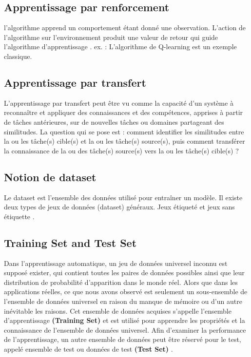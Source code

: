 \documentclass[12pt, french]{report}
\begin{document}
\subsection{Apprentissage par renforcement}l'algorithme apprend un comportement étant donné une observation. L'action de l'algorithme sur l'environnement produit une valeur de retour qui guide l'algorithme d'apprentissage \cite{key13}.
ex. : L'algorithme de Q-learning est un exemple classique.
\subsection{Apprentissage par transfert}
L’apprentissage par transfert peut être vu comme la capacité d’un système à reconnaître et appliquer des connaissances et des compétences, apprises à partir de tâches antérieures, sur de nouvelles tâches ou domaines partageant des similitudes. La question qui se pose est : comment identifier les similitudes entre la ou les tâche(s) cible(s) et la ou les tâche(s) source(s), puis comment transférer la connaissance de la ou des tâche(s) source(s) vers la ou les tâche(s) cible(s) ? \cite{key13}
\subsection{Notion de dataset}
Le dataset est l'ensemble des données utilisé pour entraîner un modèle. Il existe deux types de jeux de données (dataset) généraux. Jeux étiqueté et jeux sans étiquette \cite{key15}.
\subsection{Training Set and Test Set}
Dans l'apprentissage automatique, un jeu de données universel inconnu est supposé exister, qui contient toutes les paires de données possibles ainsi que leur distribution de probabilité d'apparition dans le monde réel. Alors que dans les applications réelles, ce que nous avons observé est seulement un sous-ensemble de l'ensemble de données universel en raison du manque de mémoire ou d'un autre inévitable les raisons. Cet ensemble de données acquises s'appelle l'ensemble d'apprentissage \textbf{(Training Set)} et est utilisé pour apprendre les propriétés et la connaissance de l'ensemble de données universel. Afin d'examiner la performance de l'apprentissage, un autre ensemble de données peut être réservé pour le test, appelé ensemble de test ou données de test \textbf{(Test Set)} \cite{key15}.\\
\end{document}

